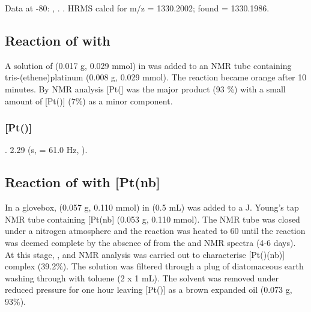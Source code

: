 
Data at -80\degC:
,
.
.
HRMS calcd for  m/z = 1330.2002; found = 1330.1986.

\subsection*{Reaction of \Phthixantphos{} with \texorpdfstring{\ce{[Pt(C2H4)3]}} P}

A solution of \PhThixantphos{} (0.017 g, 0.029 mmol) in  was added to an NMR tube containing tris-(ethene)platinum (0.008 g, 0.029 mmol).  The reaction became orange after 10 minutes.  By \phosphorus{} NMR analysis [Pt(\Phthixantphos{}] was the major product (93 \%) with a small amount of [Pt(\Phthixantphos)] (7\%) as a minor component.  

\subsubsection{[Pt(\Phthixantphos)]}

.
2.29 (s, \JPtH{} = 61.0 Hz, ).
 
\subsection*{Reaction of \tButhixantphos{} with \texorpdfstring{[Pt(nb]} P} 

In a glovebox, \tBuThixantphos{} (0.057 g, 0.110 mmol) in  (0.5 mL) was added to a J. Young's tap NMR tube containing [Pt(nb] (0.053 g, 0.110 mmol).  The NMR tube was closed under a nitrogen atmosphere and the reaction was heated to 60 \degC{} until the reaction was deemed complete by the absence of \tBuThixantphos{} from the \phosphorus{} and \proton{} NMR spectra (4-6 days).  At this stage, \proton{}, \carbon{} and \phosphorus{} NMR analysis was carried out to characterise [Pt(\tButhixantphos)(nb)] complex (39.2\%).  The solution was filtered through a plug of diatomaceous earth washing through with toluene (2 x 1 mL).  The solvent was removed under reduced pressure for one hour leaving [Pt(\tButhixantphos)] as a brown expanded oil (0.073 g, 93\%).


